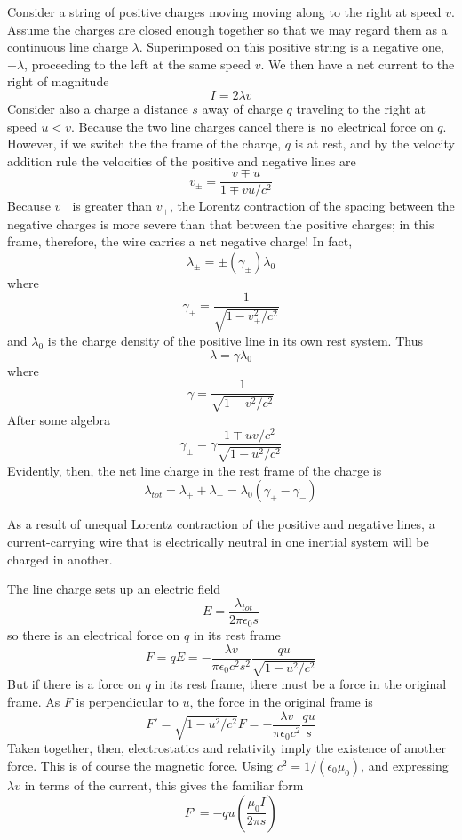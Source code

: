 Consider a string of positive charges moving moving along to the right at speed $v$. Assume the charges are closed enough together so that we may regard them as a continuous line charge $\lambda$. Superimposed on this positive string is a negative one, $-\lambda$, proceeding to the left at the same speed $v$. We then have a net current to the right of magnitude $$I = 2\lambda v$$
Consider also a charge a distance $s$ away of charge $q$ traveling to the right at speed $u < v$. Because the two line charges cancel there is no electrical force on $q$. However, if we switch the the frame of the charqe, $q$ is at rest, and by the velocity addition rule the velocities of the positive and negative lines are $$v_{\pm} = \frac{v\mp u}{1\mp vu/c^2}$$
Because $v_-$ is greater than $v_+$, the Lorentz contraction of the spacing between the negative charges is more severe than that between the positive charges; in this frame, therefore, the wire carries a net negative charge! In fact, $$\lambda_{\pm} = \pm(\gamma_{\pm})\lambda_0$$
where $$\gamma_{\pm} = \frac{1}{\sqrt{1-v_{\pm}^2/c^2}}$$
and $\lambda_0$ is the charge density of the positive line in its own rest system. Thus $$\lambda = \gamma \lambda_0$$ where $$\gamma = \frac{1}{\sqrt{1-v^2/c^2}}$$
After some algebra \begin{equation*}
    \gamma_{\pm} = \gamma \frac{1\mp uv/c^2}{\sqrt{1-u^2/c^2}}
\end{equation*}
Evidently, then, the net line charge in the rest frame of the charge is $$\lambda_{tot} = \lambda_+ + \lambda_- = \lambda_0(\gamma_+-\gamma_-)$$
\begin{rmk}
    As a result of unequal Lorentz contraction of the positive and negative lines, a current-carrying wire that is electrically neutral in one inertial system will be charged in another.
\end{rmk}

The line charge sets up an electric field $$E = \frac{\lambda_{tot}}{2\pi \epsilon_0s}$$
so there is an electrical force on $q$ in its rest frame $$F = qE = -\frac{\lambda v}{\pi\epsilon_0c^2s^2}\frac{qu}{\sqrt{1-u^2/c^2}}$$
But if there is a force on $q$ in its rest frame, there must be a force in the original frame. As $F$ is perpendicular to $u$, the force in the original frame is $$F' = \sqrt{1-u^2/c^2}F = -\frac{\lambda v}{\pi\epsilon_0c^2}\frac{qu}{s}$$
Taken together, then, electrostatics and relativity imply the existence of another force. This is of course the magnetic force. Using $c^2 = 1/(\epsilon_0\mu_0)$, and expressing $\lambda v$ in terms of the current, this gives the familiar form $$F' = -qu\left(\frac{\mu_0I}{2\pi s}\right)$$


